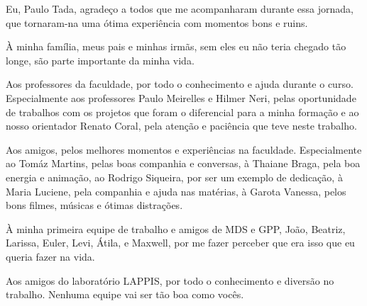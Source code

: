 Eu, Paulo Tada, agradeço a todos que me acompanharam durante essa jornada,
que tornaram-na uma ótima experiência com momentos bons e ruins.

À minha família, meus pais e minhas irmãs, sem eles eu não teria chegado tão
longe, são parte importante da minha vida.

Aos professores da faculdade, por todo o conhecimento e ajuda durante o curso. Especialmente
aos professores Paulo Meirelles e Hilmer Neri, pelas oportunidade de trabalhos com os
projetos que foram o diferencial para a minha formação e ao nosso orientador Renato Coral,
pela atenção e paciência que teve neste trabalho.

Aos amigos, pelos melhores momentos e experiências na faculdade. Especialmente
ao Tomáz Martins, pelas boas companhia e conversas, à Thaiane Braga, pela boa energia
e animação, ao Rodrigo Siqueira, por ser um exemplo de dedicação, à
Maria Luciene, pela companhia e ajuda nas matérias, à Garota Vanessa, pelos bons filmes,
músicas e ótimas distrações.

À minha primeira equipe de trabalho e amigos de MDS e GPP, João, Beatriz, Larissa, Euler,
Levi, Átila, e Maxwell, por me fazer perceber que era isso que eu queria fazer na vida.

Aos amigos do laboratório LAPPIS, por todo o conhecimento e diversão no trabalho.
Nenhuma equipe vai ser tão boa como vocês.

